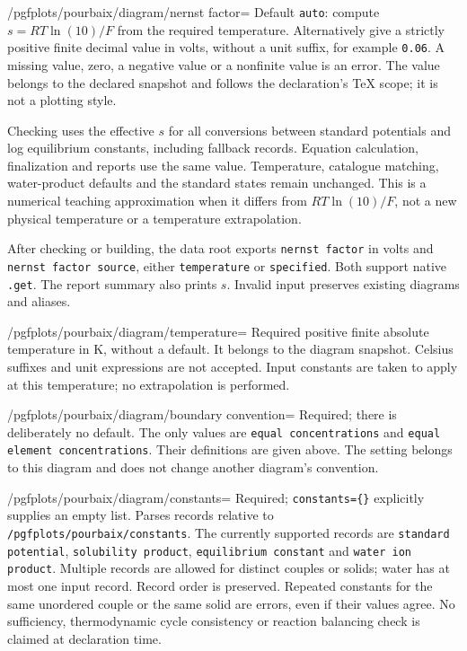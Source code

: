 \documentclass[a4paper,11pt]{ltxdoc}
\begin{document}
\begin{key}{/pgfplots/pourbaix/diagram/nernst factor=}
Default \texttt{auto}: compute $s=RT\ln(10)/F$ from the required temperature.
Alternatively give a strictly positive finite decimal value in volts, without
a unit suffix, for example \texttt{0.06}. A missing value, zero, a negative
value or a nonfinite value is an error. The value belongs to the declared
snapshot and follows the declaration's TeX scope; it is not a plotting style.

Checking uses the effective $s$ for all conversions between standard potentials
and log equilibrium constants, including fallback records. Equation calculation,
finalization and reports use the same value. Temperature, catalogue matching,
water-product defaults and the standard states remain unchanged. This is a
numerical teaching approximation when it differs from $RT\ln(10)/F$, not a
new physical temperature or a temperature extrapolation.

After checking or building, the data root exports \texttt{nernst factor} in volts
and \texttt{nernst factor source}, either \texttt{temperature} or
\texttt{specified}. Both support native \texttt{.get}. The report summary also
prints $s$. Invalid input preserves existing diagrams and aliases.
\end{key}
\begin{key}{/pgfplots/pourbaix/diagram/temperature=}
Required positive finite absolute temperature in K, without a default. It belongs
to the diagram snapshot. Celsius suffixes and unit expressions are not accepted.
Input constants are taken to apply at this temperature; no extrapolation is
performed.
\end{key}
\begin{key}{/pgfplots/pourbaix/diagram/boundary convention=}
Required; there is deliberately no default. The only values are
\texttt{equal concentrations} and \texttt{equal element concentrations}.
Their definitions are given above. The setting belongs to this diagram and does
not change another diagram's convention.
\end{key}
\begin{key}{/pgfplots/pourbaix/diagram/constants=}
Required; \texttt{constants=\{\}} explicitly supplies an empty list. Parses records
relative to \texttt{/pgfplots/pourbaix/constants}. The currently supported records
are \texttt{standard potential}, \texttt{solubility product},
\texttt{equilibrium constant} and \texttt{water ion product}. Multiple records
are allowed for distinct couples or solids; water has at most one input record. Record order is preserved.
Repeated constants for the same unordered couple or the same solid are errors,
even if their values agree. No sufficiency, thermodynamic cycle consistency or
reaction balancing check is claimed at declaration time.
\end{key}
\end{document}
